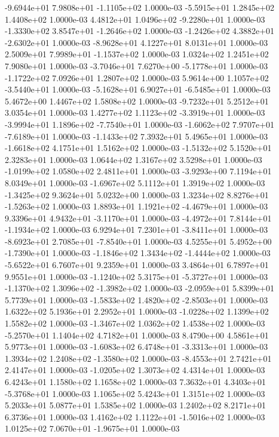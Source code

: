 -9.6944e+01  7.9808e+01 -1.1105e+02  1.0000e-03
-5.5915e+01  1.2845e+02  1.4408e+02  1.0000e-03
 4.4812e+01  1.0496e+02 -9.2280e+01  1.0000e-03
-1.3330e+02  3.8547e+01 -1.2646e+02  1.0000e-03
-1.2426e+02  4.3882e+01 -2.6302e+01  1.0000e-03
-8.9628e+01  4.1227e+01  8.0131e+01  1.0000e-03
 2.5009e+01  7.9989e+01 -1.1537e+02  1.0000e-03
1.0324e+02 1.2451e+02 7.9080e+01  1.0000e-03
-3.7046e+01  7.6270e+00 -5.1778e+01  1.0000e-03
-1.1722e+02  7.0926e+01  1.2807e+02  1.0000e-03
 5.9614e+00  1.1057e+02 -3.5440e+01  1.0000e-03
-5.1628e+01  6.9027e+01 -6.5485e+01  1.0000e-03
5.4672e+00 1.4467e+02 1.5808e+02  1.0000e-03
-9.7232e+01  5.2512e+01  3.0354e+01  1.0000e-03
 1.4277e+02  1.1123e+02 -3.3919e+01  1.0000e-03
-3.9994e+01  1.1896e+02 -7.7540e+01  1.0000e-03
-1.6062e+02  7.9707e+01 -7.6189e+01  1.0000e-03
-1.1433e+02  7.3932e+01  5.4965e+01  1.0000e-03
-1.6618e+02  4.1751e+01  1.5162e+02  1.0000e-03
-1.5132e+02  5.1520e+01  2.3283e+01  1.0000e-03
1.0644e+02 1.3167e+02 3.5298e+01  1.0000e-03
-1.0199e+02  1.0580e+02  2.4811e+01  1.0000e-03
-3.9293e+00  7.1194e+01  8.0349e+01  1.0000e-03
-1.6967e+02  5.1112e+01  1.3919e+02  1.0000e-03
-1.3425e+02  9.3624e+01  5.0232e+00  1.0000e-03
 1.3234e+02  8.8276e+01 -1.5263e+02  1.0000e-03
 1.8893e+01  1.1921e+02 -4.4679e+01  1.0000e-03
 9.3396e+01  4.9432e+01 -3.1170e+01  1.0000e-03
-4.4972e+01  7.8144e+01 -1.1934e+02  1.0000e-03
 6.9294e+01  7.2301e+01 -3.8411e+01  1.0000e-03
-8.6923e+01  2.7085e+01 -7.8540e+01  1.0000e-03
 4.5255e+01  5.4952e+00 -1.7390e+01  1.0000e-03
-1.1846e+02  1.3434e+02 -1.4444e+02  1.0000e-03
-5.6522e+01  6.7607e+01  9.2359e+01  1.0000e-03
3.4864e+01 6.7897e+01 9.9551e+01  1.0000e-03
-1.1240e+02  5.3175e+01 -5.3727e+01  1.0000e-03
-1.1370e+02  1.3096e+02 -1.3982e+02  1.0000e-03
-2.0959e+01  5.8399e+01  5.7739e+01  1.0000e-03
-1.5833e+02  1.4820e+02 -2.8503e+01  1.0000e-03
1.6322e+02 5.1936e+01 2.2952e+01  1.0000e-03
-1.0228e+02  1.1399e+02  1.5582e+02  1.0000e-03
-1.3467e+02  1.0362e+02  1.4538e+02  1.0000e-03
-5.2570e+01  1.1404e+02  4.7182e+01  1.0000e-03
8.4790e+00 4.5861e+01 5.9773e+01  1.0000e-03
-1.6083e+02  6.4748e+01 -3.3313e+01  1.0000e-03
 1.3934e+02  1.2408e+02 -1.3580e+02  1.0000e-03
-8.4553e+01  2.7421e+01  2.4147e+01  1.0000e-03
-1.0205e+02  1.3073e+02  4.4314e+01  1.0000e-03
6.4243e+01 1.1580e+02 1.1658e+02  1.0000e-03
 7.3632e+01  4.3403e+01 -5.3768e+01  1.0000e-03
1.1065e+02 5.4243e+01 1.3151e+02  1.0000e-03
5.2033e+01 5.0877e+01 1.5385e+02  1.0000e-03
1.2402e+02 8.2171e+01 6.3736e+01  1.0000e-03
 1.4162e+02  1.1122e+01 -1.5016e+02  1.0000e-03
 1.0125e+02  7.0670e+01 -1.9675e+01  1.0000e-03

